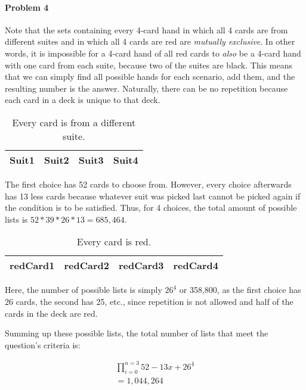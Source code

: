 \documentclass{article}
\newcommand{\fallingfactorial}[1]{%
  ^{\underline{#1}}%
}
\begin{document}
	\paragraph{Problem 4}
	
	Note that the sets containing every 4-card hand in which all 4 cards are from different suites and 
	in which all 4 cards are red are \textit{mutually exclusive}. In other words, it is impossible for 
	a 4-card hand of all red cards to \textit{also} be a 4-card hand with one card from each suite, 
	because two of the suites are black. This means that we can simply find all possible hands for each
	scenario, add them, and the resulting number is the answer. Naturally, there can be no repetition because
	each card in a deck is unique to that deck.
	
	\begin{table} [h!]
	\centering
		\begin{tabular} { | c | c | c | c | }
		\hline
		Suit1 & Suit2 & Suit3 & Suit4 \\ 
		\hline
		\end{tabular}
		\caption{Every card is from a different suite.}
	\end{table}
	
	The first choice has 52 cards to choose from. However, every choice afterwards has 13 less cards because
	whatever suit was picked last cannot be picked again if the condition is to be satisfied. Thus, for 4 choices, 
	the total amount of possible lists is $52*39*26*13 = 685,464$.
	
	\begin{table} [h!]
	\centering
		\begin{tabular} { | c | c | c | c | }
		\hline
		redCard1 & redCard2 & redCard3 & redCard4 \\ 
		\hline
		\end{tabular}
		\caption{Every card is red.}
	\end{table}
	
	Here, the number of possible lists is simply $26\fallingfactorial{4}$ or 358,800, as the first choice 
	has 26 cards, the second has 25, etc., since repetition is not allowed and half of the cards 
	in the deck are red. 
	
	Summing up these possible lists, the total number of lists that meet the question's criteria is:
	
	\begin{align}
	\prod_{i=0}^{n = 3} 52 - 13x + 26\fallingfactorial{4}\\
	= 1,044,264
	\end{align}
\end{document}
